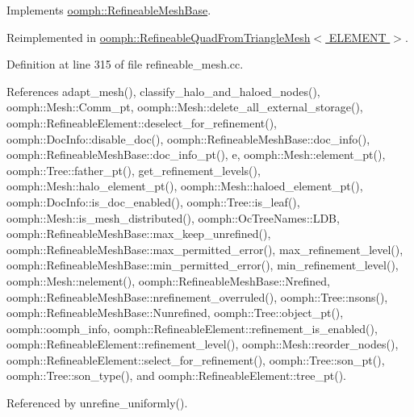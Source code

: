Implements \hyperlink{classoomph_1_1RefineableMeshBase_aabe38fc56f2f12e91f2a2e8a4cf663b0}{oomph\+::\+Refineable\+Mesh\+Base}.



Reimplemented in \hyperlink{classoomph_1_1RefineableQuadFromTriangleMesh_a7d2efa292dd5dd4930e661fd32e42eec}{oomph\+::\+Refineable\+Quad\+From\+Triangle\+Mesh$<$ E\+L\+E\+M\+E\+N\+T $>$}.



Definition at line 315 of file refineable\+\_\+mesh.\+cc.



References adapt\+\_\+mesh(), classify\+\_\+halo\+\_\+and\+\_\+haloed\+\_\+nodes(), oomph\+::\+Mesh\+::\+Comm\+\_\+pt, oomph\+::\+Mesh\+::delete\+\_\+all\+\_\+external\+\_\+storage(), oomph\+::\+Refineable\+Element\+::deselect\+\_\+for\+\_\+refinement(), oomph\+::\+Doc\+Info\+::disable\+\_\+doc(), oomph\+::\+Refineable\+Mesh\+Base\+::doc\+\_\+info(), oomph\+::\+Refineable\+Mesh\+Base\+::doc\+\_\+info\+\_\+pt(), e, oomph\+::\+Mesh\+::element\+\_\+pt(), oomph\+::\+Tree\+::father\+\_\+pt(), get\+\_\+refinement\+\_\+levels(), oomph\+::\+Mesh\+::halo\+\_\+element\+\_\+pt(), oomph\+::\+Mesh\+::haloed\+\_\+element\+\_\+pt(), oomph\+::\+Doc\+Info\+::is\+\_\+doc\+\_\+enabled(), oomph\+::\+Tree\+::is\+\_\+leaf(), oomph\+::\+Mesh\+::is\+\_\+mesh\+\_\+distributed(), oomph\+::\+Oc\+Tree\+Names\+::\+L\+DB, oomph\+::\+Refineable\+Mesh\+Base\+::max\+\_\+keep\+\_\+unrefined(), oomph\+::\+Refineable\+Mesh\+Base\+::max\+\_\+permitted\+\_\+error(), max\+\_\+refinement\+\_\+level(), oomph\+::\+Refineable\+Mesh\+Base\+::min\+\_\+permitted\+\_\+error(), min\+\_\+refinement\+\_\+level(), oomph\+::\+Mesh\+::nelement(), oomph\+::\+Refineable\+Mesh\+Base\+::\+Nrefined, oomph\+::\+Refineable\+Mesh\+Base\+::nrefinement\+\_\+overruled(), oomph\+::\+Tree\+::nsons(), oomph\+::\+Refineable\+Mesh\+Base\+::\+Nunrefined, oomph\+::\+Tree\+::object\+\_\+pt(), oomph\+::oomph\+\_\+info, oomph\+::\+Refineable\+Element\+::refinement\+\_\+is\+\_\+enabled(), oomph\+::\+Refineable\+Element\+::refinement\+\_\+level(), oomph\+::\+Mesh\+::reorder\+\_\+nodes(), oomph\+::\+Refineable\+Element\+::select\+\_\+for\+\_\+refinement(), oomph\+::\+Tree\+::son\+\_\+pt(), oomph\+::\+Tree\+::son\+\_\+type(), and oomph\+::\+Refineable\+Element\+::tree\+\_\+pt().



Referenced by unrefine\+\_\+uniformly().

\mbox{\label{classoomph_1_1TreeBasedRefineableMeshBase_acef8ac2f0f2cffe938031db1499c598b}} 
